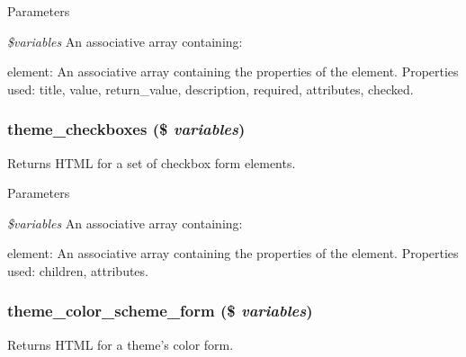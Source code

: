 \begin{DoxyParams}{Parameters}
\item[{\em \$variables}]An associative array containing:
\begin{DoxyItemize}
\item element: An associative array containing the properties of the element. Properties used: title, value, return\_\-value, description, required, attributes, checked. 
\end{DoxyItemize}\end{DoxyParams}
\hypertarget{group__themeable_gad099d8895d2a4e86fa807a369d533648}{
\subsubsection[{theme\_\-checkboxes}]{\setlength{\rightskip}{0pt plus 5cm}theme\_\-checkboxes (\$ {\em variables})}}
\label{group__themeable_gad099d8895d2a4e86fa807a369d533648}
Returns HTML for a set of checkbox form elements.


\begin{DoxyParams}{Parameters}
\item[{\em \$variables}]An associative array containing:
\begin{DoxyItemize}
\item element: An associative array containing the properties of the element. Properties used: children, attributes. 
\end{DoxyItemize}\end{DoxyParams}
\hypertarget{group__themeable_ga08f8bd750587602eebbd205d192dbe9c}{
\subsubsection[{theme\_\-color\_\-scheme\_\-form}]{\setlength{\rightskip}{0pt plus 5cm}theme\_\-color\_\-scheme\_\-form (\$ {\em variables})}}
\label{group__themeable_ga08f8bd750587602eebbd205d192dbe9c}
Returns HTML for a theme's color form.


